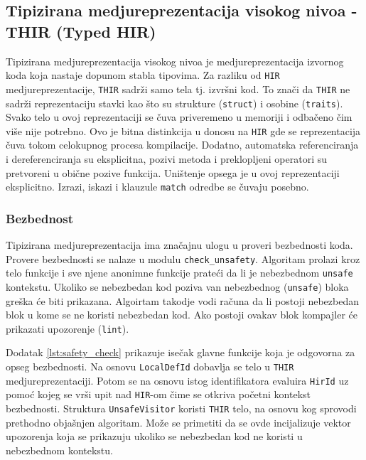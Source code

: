 \subsection{Tipizirana medjureprezentacija visokog nivoa - THIR (Typed HIR)}

Tipizirana medjureprezentacija visokog nivoa je medjureprezentacija izvornog koda koja nastaje dopunom stabla tipovima.
Za razliku od \verb|HIR| medjureprezentacije, \verb|THIR| sadrži samo tela tj. izvršni kod. To znači da \verb|THIR| 
ne sadrži reprezentaciju stavki kao što su strukture (\verb|struct|) i osobine (\verb|traits|). Svako telo u ovoj reprezentaciji
se čuva priveremeno u memoriji i odbačeno čim više nije potrebno. Ovo je bitna distinkcija u donosu na \verb|HIR| gde se reprezentacija 
čuva tokom celokupnog procesa kompilacije. Dodatno, automatska referenciranja i dereferenciranja su eksplicitna, pozivi metoda i 
preklopljeni operatori su pretvoreni u obične pozive funkcija. Uništenje opsega je u ovoj reprezentaciji eksplicitno.
Izrazi, iskazi i klauzule \verb|match| odredbe se čuvaju posebno.

\subsubsection{Bezbednost}

Tipizirana medjureprezentacija ima značajnu ulogu u proveri bezbednosti koda. Provere bezbednosti se nalaze u modulu \verb|check_unsafety|.
Algoritam prolazi kroz telo funkcije i sve njene anonimne funkcije prateći da li je nebezbednom \verb|unsafe| kontekstu.
Ukoliko se nebezbedan kod poziva van nebezbednog (\verb|unsafe|) bloka greška će biti prikazana. Algoirtam takodje vodi računa da li 
postoji nebezbedan blok u kome se ne koristi nebezbedan kod. Ako postoji ovakav blok kompajler će prikazati upozorenje (\verb|lint|).

Dodatak \ref{lst:safety_check} prikazuje isečak glavne funkcije koja je odgovorna za opseg bezbednosti. 
Na osnovu \verb|LocalDefId| dobavlja se telo u \verb|THIR| medjureprezentaciji. Potom se na osnovu istog 
identifikatora evaluira \verb|HirId| uz pomoć kojeg se vrši upit nad \verb|HIR|-om čime se otkriva početni kontekst bezbednosti.
Struktura \verb|UnsafeVisitor| koristi \verb|THIR| telo, na osnovu kog sprovodi prethodno objašnjen algoritam. Može se primetiti 
da se ovde incijalizuje vektor upozorenja koja se prikazuju ukoliko se nebezbedan kod ne koristi u nebezbednom kontekstu.

